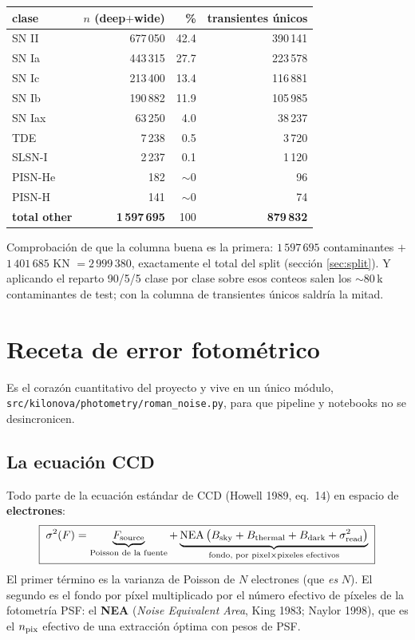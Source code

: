 \documentclass[11pt,a4paper]{article}
\newcommand{\code}[1]{\texttt{\small #1}}
\begin{document}
\begin{center}
\begin{tabular}{lrrr}
\toprule
clase & $n$ (deep$+$wide) & \% & transientes únicos \\
\midrule
SN II    & 677\,050 & 42.4 & 390\,141 \\
SN Ia    & 443\,315 & 27.7 & 223\,578 \\
SN Ic    & 213\,400 & 13.4 & 116\,881 \\
SN Ib    & 190\,882 & 11.9 & 105\,985 \\
SN Iax   & 63\,250  & 4.0  & 38\,237 \\
TDE      & 7\,238   & 0.5  & 3\,720 \\
SLSN-I   & 2\,237   & 0.1  & 1\,120 \\
PISN-He  & 182      & $\sim$0 & 96 \\
PISN-H   & 141      & $\sim$0 & 74 \\
\midrule
\textbf{total other} & \textbf{1\,597\,695} & 100 & \textbf{879\,832} \\
\bottomrule
\end{tabular}
\end{center}

\noindent Comprobación de que la columna buena es la primera: $1\,597\,695$ contaminantes $+$
$1\,401\,685$ KN $= 2\,999\,380$, exactamente el total del split (sección \ref{sec:split}). Y
aplicando el reparto 90/5/5 clase por clase sobre esos conteos salen los $\sim$80\,k contaminantes
de test; con la columna de transientes únicos saldría la mitad.

\section{Receta de error fotométrico}

Es el corazón cuantitativo del proyecto y vive en un único módulo,
\code{src/kilonova/photometry/roman\_noise.py}, para que pipeline y notebooks no se
desincronicen.

\subsection{La ecuación CCD}
Todo parte de la ecuación estándar de CCD (Howell 1989, eq.\ 14) en espacio de \textbf{electrones}:
\begin{equation}
\boxed{\;\sigma^2(F) = \underbrace{F_{\rm source}}_{\text{Poisson de la fuente}}
 + \underbrace{\mathrm{NEA}\,\bigl(B_{\rm sky} + B_{\rm thermal} + B_{\rm dark} + \sigma_{\rm read}^2\bigr)}_{\text{fondo, por pixel} \times \text{pixeles efectivos}}\;}
\label{eq:ccd}
\end{equation}
El primer término es la varianza de Poisson de $N$ electrones (que \emph{es} $N$). El segundo es el
fondo por píxel multiplicado por el número efectivo de píxeles de la fotometría PSF: el
\textbf{NEA} (\emph{Noise Equivalent Area}, King 1983; Naylor 1998), que es el $n_{\rm pix}$
efectivo de una extracción óptima con pesos de PSF.
\end{document}
